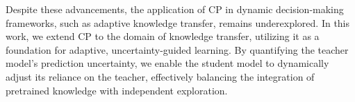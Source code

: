 Despite these advancements, the application of CP in dynamic decision-making frameworks, such as adaptive knowledge transfer, remains underexplored. In this work, we extend CP to the domain of knowledge transfer, utilizing it as a foundation for adaptive, uncertainty-guided learning. By quantifying the teacher model’s prediction uncertainty, we enable the student model to dynamically adjust its reliance on the teacher, effectively balancing the integration of pretrained knowledge with independent exploration.

\vspace{-5pt}
